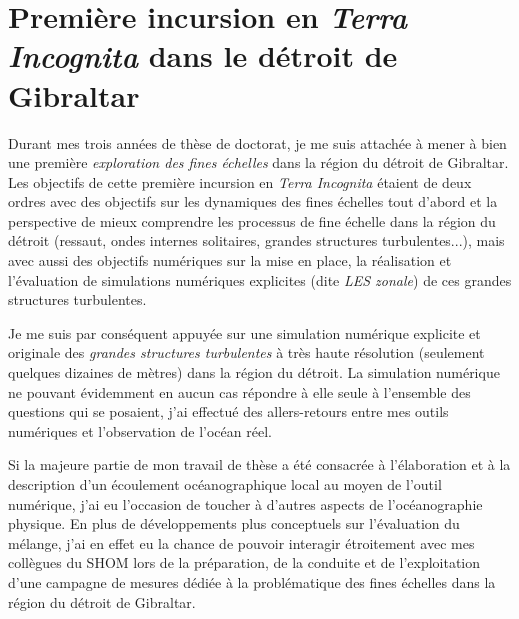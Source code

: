 
\color{blue}
\section{Première incursion en \textit{Terra Incognita} dans le détroit de Gibraltar}
Durant mes trois années de thèse de doctorat, je me suis attachée à mener à bien une première \textit{exploration des fines échelles} dans la région du détroit de Gibraltar. Les objectifs de cette première incursion en \textit{Terra Incognita} étaient de deux ordres avec des objectifs sur les dynamiques des fines échelles tout d'abord et la perspective de mieux comprendre les processus de fine échelle dans la région du détroit (ressaut, ondes internes solitaires, grandes structures turbulentes...), mais avec aussi des objectifs numériques sur la mise en place, la réalisation et l'évaluation de simulations numériques explicites (dite \textit{LES zonale}) de ces grandes structures turbulentes.

Je me suis par conséquent appuyée sur une simulation numérique explicite et originale des \textit{grandes structures turbulentes} à très haute résolution (seulement quelques dizaines de mètres) dans la région du détroit. La simulation numérique ne pouvant évidemment en aucun cas répondre à elle seule à l'ensemble des questions qui se posaient, j'ai effectué des allers-retours entre mes outils numériques et l'observation de l'océan réel. 

Si la majeure partie de mon travail de thèse a été consacrée à l'élaboration et à la description d'un écoulement océanographique local au moyen de l'outil numérique, j'ai eu l'occasion de toucher à d'autres aspects de l'océanographie physique.
En plus de développements plus conceptuels sur l'évaluation du mélange,  j'ai en effet eu la chance de pouvoir interagir étroitement avec mes collègues du SHOM lors de la préparation, de la conduite et de l'exploitation d'une campagne de mesures dédiée à la problématique des fines échelles dans la région du détroit de Gibraltar.

